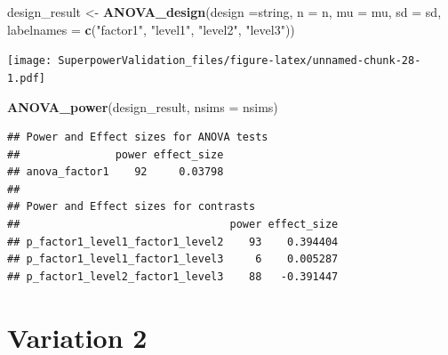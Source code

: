 \documentclass[]{book}
\newenvironment{Shaded}{\begin{snugshade}}{\end{snugshade}}
\newcommand{\DataTypeTok}[1]{\textcolor[rgb]{0.13,0.29,0.53}{#1}}
\newcommand{\KeywordTok}[1]{\textcolor[rgb]{0.13,0.29,0.53}{\textbf{#1}}}
\newcommand{\NormalTok}[1]{#1}
\newcommand{\StringTok}[1]{\textcolor[rgb]{0.31,0.60,0.02}{#1}}
\begin{document}
\begin{Shaded}
\begin{Highlighting}[]
\NormalTok{design_result <-}\StringTok{ }\KeywordTok{ANOVA_design}\NormalTok{(}\DataTypeTok{design =}\NormalTok{string,}
                   \DataTypeTok{n =}\NormalTok{ n, }
                   \DataTypeTok{mu =}\NormalTok{ mu, }
                   \DataTypeTok{sd =}\NormalTok{ sd, }
                   \DataTypeTok{labelnames =} \KeywordTok{c}\NormalTok{(}\StringTok{"factor1"}\NormalTok{, }\StringTok{"level1"}\NormalTok{, }\StringTok{"level2"}\NormalTok{, }\StringTok{"level3"}\NormalTok{))}
\end{Highlighting}
\end{Shaded}

\texttt{[image: SuperpowerValidation\_files/figure-latex/unnamed-chunk-28-1.pdf]}

\begin{Shaded}
\begin{Highlighting}[]
\KeywordTok{ANOVA_power}\NormalTok{(design_result, }\DataTypeTok{nsims =}\NormalTok{ nsims)}
\end{Highlighting}
\end{Shaded}

\begin{verbatim}
## Power and Effect sizes for ANOVA tests
##               power effect_size
## anova_factor1    92     0.03798
## 
## Power and Effect sizes for contrasts
##                                 power effect_size
## p_factor1_level1_factor1_level2    93    0.394404
## p_factor1_level1_factor1_level3     6    0.005287
## p_factor1_level2_factor1_level3    88   -0.391447
\end{verbatim}

\hypertarget{variation-2}{%
\section{Variation 2}\label{variation-2}}
\end{document}
